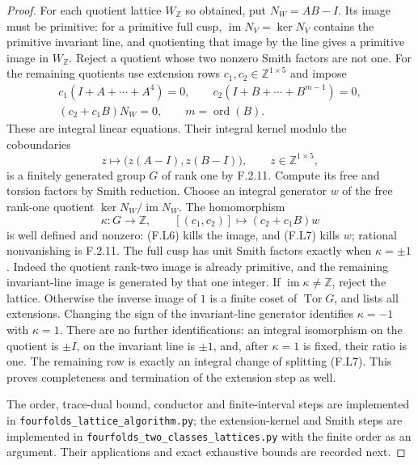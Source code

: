 \begin{proof}
For each quotient lattice $W_{\mathbb Z}$ so obtained,
put $N_W=AB-I$.
Its image must be primitive: for a primitive full cusp,
$\operatorname{im}N_V=\ker N_V$ contains the primitive
invariant line, and quotienting that image by the line
gives a primitive image in $W_{\mathbb Z}$.
Reject a quotient whose two nonzero Smith factors are
not one.  For the remaining quotients use extension rows
$c_1,c_2\in\mathbb Z^{1\times5}$ and impose
\[
\begin{gathered}
 c_1(I+A+\cdots+A^4)=0,
 \qquad c_2(I+B+\cdots+B^{m-1})=0,\\
 (c_2+c_1B)N_W=0,
 \qquad m=\operatorname{ord}(B).
\end{gathered}
 \tag{F.L6}
\]
These are integral linear equations.  Their integral kernel
modulo the coboundaries
\[
 z\longmapsto\bigl(z(A-I),z(B-I)\bigr),
 \qquad z\in\mathbb Z^{1\times5},
 \tag{F.L7}
\]
is a finitely generated group $G$ of rank one by F.2.11.
Compute its free and torsion factors by Smith reduction.
Choose an integral generator $w$ of the free rank-one
quotient $\ker N_W/\operatorname{im}N_W$.
The homomorphism
\[
 \kappa:G\longrightarrow\mathbb Z,
 \qquad [(c_1,c_2)]\longmapsto(c_2+c_1B)w
 \tag{F.L8}
\]
is well defined and nonzero: (F.L6) kills the image, and
(F.L7) kills $w$; rational nonvanishing is F.2.11.
The full cusp has unit Smith factors exactly when
$\kappa=\pm1$.
Indeed the quotient rank-two image is already primitive,
and the remaining invariant-line image is generated by
that one integer.
If $\operatorname{im}\kappa\ne\mathbb Z$, reject the
lattice.  Otherwise the inverse image of $1$ is a finite
coset of $\operatorname{Tor}G$, and lists all extensions.
Changing the sign of the invariant-line generator identifies
$\kappa=-1$ with $\kappa=1$.
There are no further identifications: an integral isomorphism
on the quotient is $\pm I$, on the invariant line is
$\pm1$, and, after $\kappa=1$ is fixed, their ratio is one.
The remaining row is exactly an integral change of splitting
(F.L7).
This proves completeness and termination of the extension
step as well.

The order, trace-dual bound, conductor and finite-interval
steps are implemented in
\texttt{fourfolds\_lattice\_algorithm.py};
the extension-kernel and Smith steps are implemented in
\texttt{fourfolds\_two\_classes\_lattices.py} with the
finite order as an argument.  Their applications and exact
exhaustive bounds are recorded next.
\end{proof}


